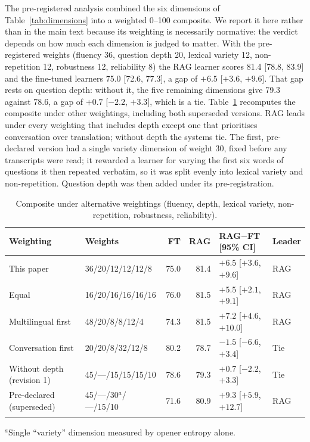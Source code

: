 \documentclass[pdflatex,sn-mathphys-num]{sn-jnl}%
\theoremstyle{thmstyleone}%
\theoremstyle{thmstyletwo}%
\theoremstyle{thmstylethree}%
\begin{document}
\begin{appendices}
The pre-registered analysis combined the six dimensions of Table~\ref{tab:dimensions} into a weighted
0--100 composite. We report it here rather than in the main text because its weighting is necessarily
normative: the verdict depends on how much each dimension is judged to matter. With the pre-registered
weights (fluency 36, question depth 20, lexical variety 12, non-repetition 12, robustness 12,
reliability 8) the RAG learner scores 81.4 [78.8, 83.9] and the fine-tuned learners 75.0 [72.6, 77.3],
a gap of $+6.5$ [$+3.6$, $+9.6$]. That gap rests on question depth: without it, the five remaining
dimensions give 79.3 against 78.6, a gap of $+0.7$ [$-2.2$, $+3.3$], which is a tie.
Table~\ref{tab:weights} recomputes the composite under other weightings, including both superseded
versions. RAG leads under every weighting that includes depth except one that prioritises
conversation over translation; without depth the systems tie. The first, pre-declared version had
a single variety dimension of weight 30, fixed before any transcripts were read; it rewarded a learner
for varying the first six words of questions it then repeated verbatim, so it was split evenly into
lexical variety and non-repetition. Question depth was then added under its pre-registration.

\begin{table}[h]
\caption{Composite under alternative weightings (fluency, depth, lexical variety, non-repetition,
robustness, reliability).}\label{tab:weights}
\footnotesize
\begin{tabular*}{\textwidth}{@{\extracolsep\fill}llrrll}
\toprule
Weighting & Weights & FT & RAG & RAG$-$FT [95\% CI] & Leader \\
\midrule
This paper & 36/20/12/12/12/8 & 75.0 & 81.4 & $+6.5$ [$+3.6$, $+9.6$] & RAG \\
Equal & 16/20/16/16/16/16 & 76.0 & 81.5 & $+5.5$ [$+2.1$, $+9.1$] & RAG \\
Multilingual first & 48/20/8/8/12/4 & 74.3 & 81.5 & $+7.2$ [$+4.6$, $+10.0$] & RAG \\
Conversation first & 20/20/8/32/12/8 & 80.2 & 78.7 & $-1.5$ [$-6.6$, $+3.4$] & Tie \\
Without depth (revision 1) & 45/---/15/15/15/10 & 78.6 & 79.3 & $+0.7$ [$-2.2$, $+3.3$] & Tie \\
Pre-declared (superseded) & 45/---/30$^{a}$/---/15/10 & 71.6 & 80.9 & $+9.3$ [$+5.9$, $+12.7$] & RAG \\
\botrule
\end{tabular*}
\footnotesize{$^{a}$Single ``variety'' dimension measured by opener entropy alone.}
\end{table}


\end{appendices}
\end{document}

